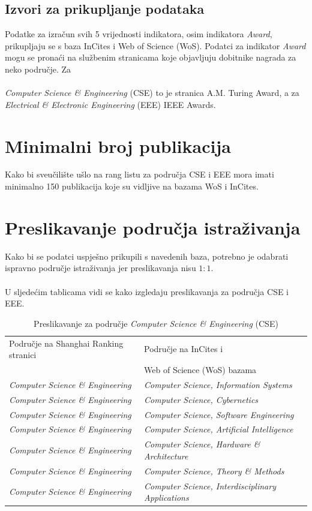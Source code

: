 \documentclass[times, utf8, zavrsni]{fer}
\begin{document}
\subsection{Izvori za prikupljanje podataka}        
Podatke za izračun svih 5 vrijednosti indikatora, osim indikatora \emph{Award}, prikupljaju se s baza InCites i Web of Science (WoS). 
Podatci za indikator \emph{Award} mogu se pronaći na službenim stranicama koje objavljuju dobitnike nagrada za neko područje.
Za \\\\\emph{Computer Science \& Engineering} (CSE) to je stranica A.M. Turing Award, a za \emph{\\Electrical \& Electronic Engineering} (EEE) IEEE Awards.

\section{Minimalni broj publikacija} Kako bi sveučilište ušlo na rang listu za područja CSE i EEE mora imati minimalno 150 publikacija koje su vidljive 
na bazama WoS i InCites.
\\ \section{Preslikavanje područja istraživanja}Kako bi se podatci uspješno prikupili s navedenih baza, potrebno je odabrati ispravno područje istraživanja jer preslikavanja nisu $1:1$.
\\\\U sljedećim tablicama vidi se kako izgledaju preslikavanja za područja CSE i EEE.

\begin{table}[htb]
    \caption{Preslikavanje za područje \emph{Computer Science \& Engineering} (CSE)}
    \label{tbl:konstante}
    \centering
    \begin{tabular}{ll} \hline
    Područje na Shanghai Ranking stranici & Područje na InCites i \\ & Web of Science (WoS) bazama\\ \hline
    \emph{Computer Science \& Engineering} & \emph{Computer Science, Information Systems} \\
    \emph{Computer Science \& Engineering} & \emph{Computer Science, Cybernetics} \\
    \emph{Computer Science \& Engineering} & \emph{Computer Science, Software Engineering} \\
    \emph{Computer Science \& Engineering} & \emph{Computer Science, Artificial Intelligence} \\
    \emph{Computer Science \& Engineering} & \emph{Computer Science, Hardware \& Architecture} \\
    \emph{Computer Science \& Engineering} & \emph{Computer Science, Theory \& Methods} \\
    \emph{Computer Science \& Engineering} & \emph{Computer Science, Interdisciplinary Applications} \\
    \end{tabular}
    \end{table}
    \FloatBarrier
    \hfil
\end{document}
